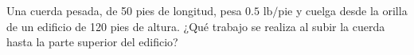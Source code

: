 \item Una cuerda pesada, de 50 pies de longitud, pesa $0.5 \text{ lb/pie}$ y cuelga desde la orilla de un edificio de 120 pies de altura. ¿Qué trabajo se realiza al subir la cuerda hasta la parte superior del edificio?

